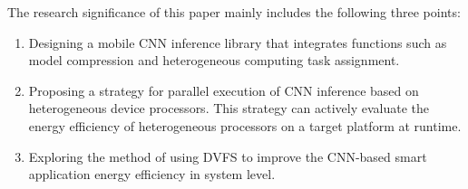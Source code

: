 \begin{enabstract}
The research significance of this paper mainly includes the following three points:

\begin{enumerate}
  \item Designing a mobile CNN inference library that integrates functions such as model compression and heterogeneous computing task assignment.
  \item Proposing a strategy for parallel execution of CNN inference based on heterogeneous device processors. This strategy can actively evaluate the energy efficiency of heterogeneous processors on a target platform at runtime.
  \item Exploring the method of using DVFS to improve the CNN-based smart application energy efficiency in system level.
\end{enumerate}

\end{enabstract}